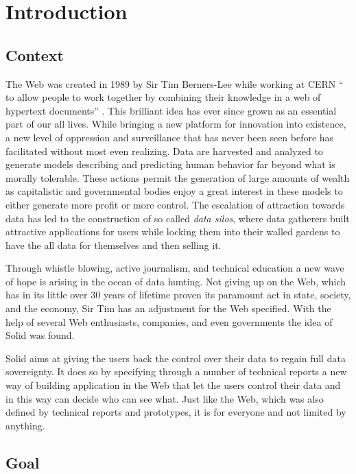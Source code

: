 \chapter{Introduction}
\section{Context}

The Web was created in 1989 by Sir Tim Berners-Lee while working at CERN “\textelp{} to allow people to work together by combining their knowledge in a web of hypertext documents” \cite{timbl-bio}. This brilliant idea has ever since grown as an essential part of our all lives. While bringing a new platform for innovation into existence, a new level of oppression and surveillance that has never been seen before has facilitated without most even realizing. Data are harvested and analyzed to generate models describing and predicting human behavior far beyond what is morally tolerable. These actions permit the generation of large amounts of wealth as capitalistic and governmental bodies enjoy a great interest in these models to either generate more profit or more control. The escalation of attraction towards data has led to the construction of so called \textit{data silos}, where data gatherers built attractive applications for users while locking them into their walled gardens to have the all data for themselves and then selling it.

Through whistle blowing, active journalism, and technical education a new wave of hope is arising in the ocean of data hunting. Not giving up on the Web, which has in its little over 30 years of lifetime proven its paramount act in state, society, and the economy, Sir Tim has an adjustment for the Web specified. With the help of several Web enthusiasts, companies, and even governments the idea of Solid was found.

Solid aims at giving the users back the control over their data to regain full data sovereignty. It does so by specifying through a number of technical reports a new way of building application in the Web that let the users control their data and in this way can decide who can see what. Just like the Web, which was also defined by technical reports and prototypes, it is for everyone and not limited by anything. 

\section{Goal}
